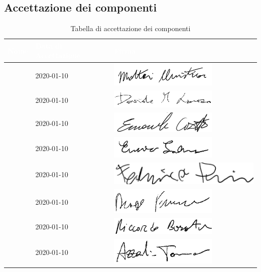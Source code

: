 \subsection{Accettazione dei componenti}
{
	\renewcommand{\arraystretch}{2}
	\begin{longtable}{ C{5cm} C{4cm} C{5cm} }
		\caption{Tabella di accettazione dei componenti}\\
		\textcolor{white}{\textbf{Nome}} & \textcolor{white}{\textbf{Data di Accettazione}} & \textcolor{white}{\textbf{Firma}}\\	\endhead
		
		
		\MC{} & 2020-01-10 & \includegraphics[scale=0.70]{Sezioni/Immagini/Firme/Christian.png}\\
		\LD{} & 2020-01-10 & \includegraphics[scale=0.60]{Sezioni/Immagini/Firme/Davide.png}\\
		\CE{} & 2020-01-10 & \includegraphics[scale=0.70]{Sezioni/Immagini/Firme/Emanuele.png} \\
		\SE{} & 2020-01-10 & \includegraphics[scale=0.70]{Sezioni/Immagini/Firme/Enrico.png}\\
		\PF{} & 2020-01-10 & \includegraphics[scale=0.50]{Sezioni/Immagini/Firme/Federico.png}\\
		\DF{} & 2020-01-10 & \includegraphics[scale=0.70]{Sezioni/Immagini/Firme/Francesco.png} \\
		\BR{} & 2020-01-10& \includegraphics[scale=0.70]{Sezioni/Immagini/Firme/Riccardo.png} \\
		\AT{} & 2020-01-10 & \includegraphics[scale=0.70]{Sezioni/Immagini/Firme/Tommaso.png} \\
		
		
	\end{longtable}
}

